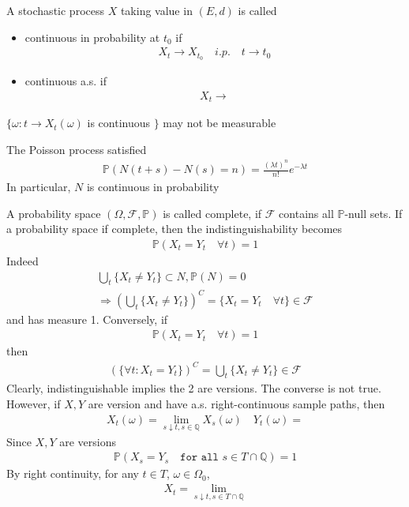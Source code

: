 \begin{definition}
	A stochastic process $X$ taking value in $(E, d)$ is called
	\begin{itemize}
		\item continuous in probability at $t_0$ if
		\begin{align*}
			X_t \rightarrow X_{t_0} \quad i.p.\quad t \rightarrow t_0
		\end{align*}
		\item continuous a.s. if
		\begin{align*}
			X_t \rightarrow 
		\end{align*}
	\end{itemize}	
\end{definition}
\begin{remark}
$\{\omega: t \rightarrow X_t(\omega)$ is continuous $\}$ may not be measurable
\end{remark}

\begin{example}
The Poisson process satisfied
\begin{align*}
	\mathbb{P}(N(t + s) - N(s) = n) = \frac{(\lambda t)^n}{n!}e^{-\lambda t}
\end{align*}	
In particular, $N$ is continuous in probability
\end{example}

A probability space $(\Omega, \mathcal{F}, \mathbb{P})$ is called complete, if $\mathcal{F}$ contains all $\mathbb{P}$-null sets. If a probability space if complete, then the indistinguishability becomes
\begin{align*}
	\mathbb{P}(X_t = Y_t \quad\forall t) = 1
\end{align*}
Indeed
\begin{align*}
	\bigcup_t \{X_t \neq Y_t \} \subset N, \mathbb{P}(N) = 0\\
	\Rightarrow (\bigcup_t \{X_t \neq Y_t \})^C = \{X_t = Y_t \quad\forall t\} \in \mathcal{F}
\end{align*}
and has measure 1. Conversely, if
\begin{align*}
	\mathbb{P}(X_t = Y_t \quad \forall t ) = 1
\end{align*}
then
\begin{align*}
	(\{\forall t: X_t = Y_t\})^C = \bigcup_t \{X_t \neq Y_t\} \in \mathcal{F}
\end{align*}
Clearly, indistinguishable implies the 2 are versions. The converse is not true. However, if $X, Y$ are version and have a.s. right-continuous sample paths, then 
\begin{align*}
	X_t(\omega) = \lim_{s \downarrow t, s \in \mathbb{Q}} X_s(\omega) \quad Y_t(\omega) = 
\end{align*}
Since $X,Y$ are versions
\begin{align*}
	\mathbb{P}(X_s = Y_s \quad \texttt{for all } s \in T\cap \mathbb{Q}) = 1
\end{align*}
By right continuity, for any $t \in T$, $\omega \in \Omega_0$, 
\begin{align*}
	X_t = \lim_{s \downarrow t, s \in T \cap \mathbb{Q}}
\end{align*}

